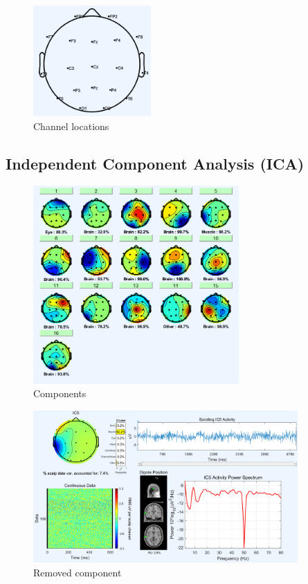 \documentclass[hidelinks,12pt]{article}
\begin{document}
	\begin{figure}[h!]
		\centering
		\includegraphics[width=0.4\textwidth]{32}
		\caption{Channel locations}
	\end{figure}
	
	\newpage
	
	\subsection{Independent Component Analysis (ICA)}
	\begin{figure}[h!]
		\centering
		\includegraphics[width=0.7\textwidth]{33}
		\caption{Components}
	\end{figure}
	
	\begin{figure}[h!]
		\centering
		\includegraphics[width=0.9\textwidth]{mci/5}
		\caption{Removed component}
	\end{figure}
	
\end{document}
